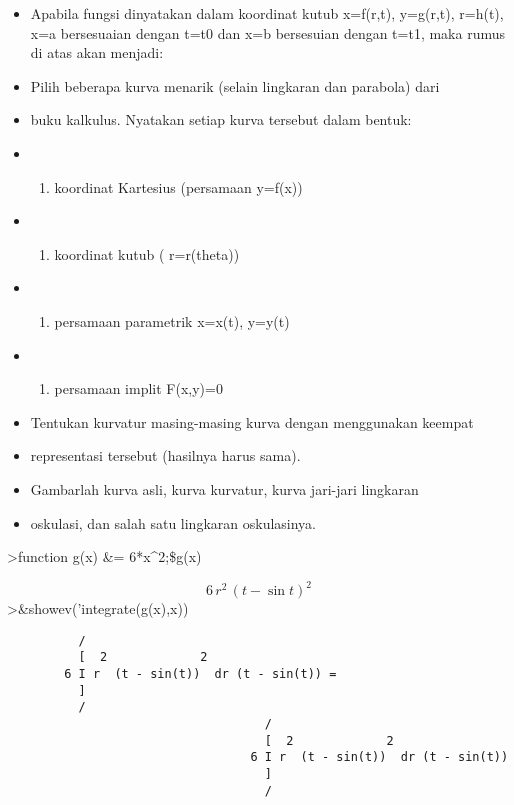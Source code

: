 \documentclass[
]{book}
\providecommand{\tightlist}{%
  \setlength{\itemsep}{0pt}\setlength{\parskip}{0pt}}
\begin{document}
\begin{itemize}
\item
  Apabila fungsi dinyatakan dalam koordinat kutub x=f(r,t), y=g(r,t), r=h(t), x=a bersesuaian dengan t=t0 dan x=b bersesuian dengan t=t1, maka rumus di atas akan menjadi:
\item
  Pilih beberapa kurva menarik (selain lingkaran dan parabola) dari
\item
  buku kalkulus. Nyatakan setiap kurva tersebut dalam bentuk:
\item
  \begin{enumerate}
  \def\labelenumi{\alph{enumi}.}
  \tightlist
  \item
    koordinat Kartesius (persamaan y=f(x))
  \end{enumerate}
\item
  \begin{enumerate}
  \def\labelenumi{\alph{enumi}.}
  \setcounter{enumi}{1}
  \tightlist
  \item
    koordinat kutub ( r=r(theta))
  \end{enumerate}
\item
  \begin{enumerate}
  \def\labelenumi{\alph{enumi}.}
  \setcounter{enumi}{2}
  \tightlist
  \item
    persamaan parametrik x=x(t), y=y(t)
  \end{enumerate}
\item
  \begin{enumerate}
  \def\labelenumi{\alph{enumi}.}
  \setcounter{enumi}{3}
  \tightlist
  \item
    persamaan implit F(x,y)=0
  \end{enumerate}
\item
  Tentukan kurvatur masing-masing kurva dengan menggunakan keempat
\item
  representasi tersebut (hasilnya harus sama).
\item
  Gambarlah kurva asli, kurva kurvatur, kurva jari-jari lingkaran
\item
  oskulasi, dan salah satu lingkaran oskulasinya.
\end{itemize}

\textgreater function g(x) \&= 6*x\^{}2;\$g(x)

\[6\,r^2\,\left(t-\sin t\right)^2\]\textgreater\&showev('integrate(g(x),x))

\begin{verbatim}
          /
          [  2             2
        6 I r  (t - sin(t))  dr (t - sin(t)) = 
          ]
          /
                                    /
                                    [  2             2
                                  6 I r  (t - sin(t))  dr (t - sin(t))
                                    ]
                                    /
\end{verbatim}
\end{document}
